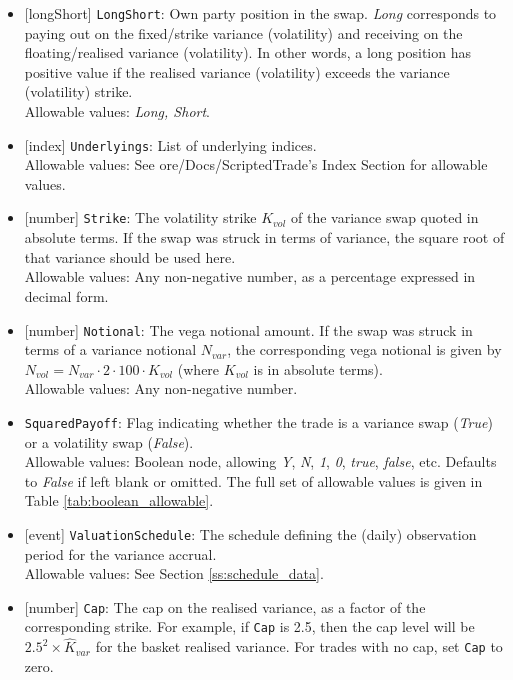 \begin{itemize}
  \item{}[longShort] \lstinline!LongShort!: Own party position in the swap. \emph{Long} corresponds to paying out on the
  fixed/strike variance (volatility) and receiving on the floating/realised variance (volatility). In other words,
  a long position has positive value if the realised variance (volatility) exceeds the variance (volatility)
  strike. \\
  Allowable values: \emph{Long, Short}.
  \item{}[index] \lstinline!Underlyings!: List of underlying indices. \\
  Allowable values: See ore/Docs/ScriptedTrade's Index Section for allowable values.
  \item{}[number] \lstinline!Strike!: The volatility strike $K_{vol}$ of the variance swap quoted in absolute terms.
  If the swap was struck in terms of variance, the square root of that variance should be used here. \\
  Allowable values: Any non-negative number, as a percentage expressed in decimal form.
  \item{}[number] \lstinline!Notional!: The vega notional amount. If the swap was struck in terms of a variance notional
  $N_{var}$, the corresponding vega notional is given by $N_{vol} = N_{var} \cdot 2 \cdot 100 \cdot K_{vol}$ (where
  $K_{vol}$ is in absolute terms). \\
  Allowable values: Any non-negative number.
  \item{} \lstinline!SquaredPayoff!: Flag indicating whether the trade is a variance swap (\emph{True})
  or a volatility swap (\emph{False}). \\
  Allowable values: Boolean node, allowing \emph{Y}, \emph{N}, \emph{1}, \emph{0}, \emph{true}, \emph{false}, etc.
  Defaults to \emph{False} if left blank or omitted. The full set of allowable values is given in Table \ref{tab:boolean_allowable}.
  \item{}[event] \lstinline!ValuationSchedule!: The schedule defining the (daily) observation period for the variance accrual. \\
  Allowable values: See Section \ref{ss:schedule_data}.
  \item{}[number] \lstinline!Cap!: The cap on the realised variance, as a factor of the corresponding strike. For example,
  if \lstinline!Cap! is 2.5, then the cap level will be $2.5^2 \times \hat{K}_{var}$ for the basket realised variance.
  For trades with no cap, set \lstinline!Cap! to zero. \\

\end{itemize}
